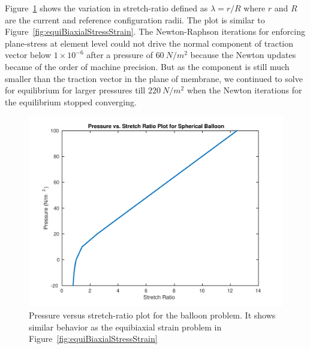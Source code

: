\documentclass[../main.tex]{subfiles}
\begin{document}
Figure~\ref{fig:pressStretch} shows the variation in stretch-ratio
defined as $\lambda=r/R$ where $r$ and $R$ are the current and
reference configuration radii. The plot is similar to
Figure~\ref{fig:equiBiaxialStressStrain}. The Newton-Raphson
iterations for enforcing plane-stress at element level could not drive
the normal component of traction vector below $1\times10^{-6}$ after a
pressure of $60\ N/m^2$ because the Newton updates became of the order
of machine precision. But as the component is still much smaller than
the traction vector in the plane of membrane, we continued to solve
for equilibrium for larger pressures till $220\ N/m^2$ when the Newton
iterations for the equilibrium stopped converging.
\begin{figure}[h!]
  \centering
  \includegraphics[scale=0.75]{./img/pressureStretch.pdf}
  \caption{Pressure versus stretch-ratio plot for the balloon
    problem. It shows similar behavior as the equibiaxial strain
    problem in Figure~\ref{fig:equiBiaxialStressStrain}}
  \label{fig:pressStretch}
\end{figure}
\end{document}
